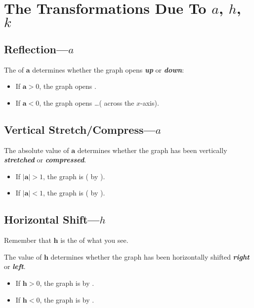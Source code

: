 \section{The Transformations Due To $a$, $h$, $k$}


\subsection{Reflection---$a$}

The  of $\bm{a}$ determines whether the graph 
opens {\bfseries\itshape up} or {\bfseries\itshape down}:
\begin{itemize}[topsep=-0.5\parskip]
    \item If $\bm{a}>0$, the graph opens .
    \item If $\bm{a}<0$, the graph opens \dots ( across the $x$-axis).
\end{itemize}


\subsection{Vertical Stretch/Compress---$a$}

The absolute value of $\bm{a}$ determines whether the graph 
has been vertically {\bfseries\itshape stretched} or {\bfseries\itshape compressed}.
\begin{itemize}[topsep=-0.5\parskip]
    \item If $|\bm{a}|>1$, the graph is \dotfill(  by ).
    \item If $|\bm{a}|<1$, the graph is \dotfill(  by ).
\end{itemize}

\subsection{Horizontal Shift---$h$}

\begin{tcolorbox}[center,width=4.75in,colback=white,toprule=0.5pt,leftrule=0.5pt,rightrule=0.5pt,bottomrule=0.5pt,]
    \centering\small
    Remember that $\bm{h}$ is the  of what you see.
\end{tcolorbox}

The value of $\bm{h}$ determines whether the graph 
has been horizontally shifted {\bfseries\itshape right} or {\bfseries\itshape left}.
\begin{itemize}[topsep=-0.5\parskip]
    \item If $\bm{h}>0$, the graph is   by .
    \item If $\bm{h}<0$, the graph is   by .
\end{itemize}



